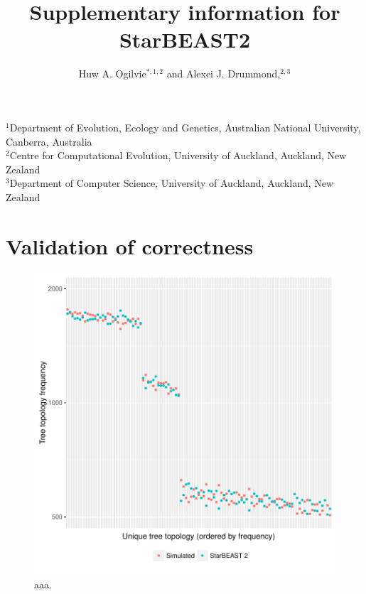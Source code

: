 \documentclass[12pt]{article}
\begin{document}
\begin{minipage}[h]{\textwidth}
	\title{Supplementary information for StarBEAST2}
	\author{Huw A. Ogilvie$^{\ast,1,2}$ and Alexei J. Drummond,$^{2,3}$}
    \maketitle
\end{minipage}

\raggedright
$^{1}$Department of Evolution, Ecology and Genetics, Australian National University, Canberra, Australia\\
$^{2}$Centre for Computational Evolution, University of Auckland, Auckland, New Zealand\\
$^{3}$Department of Computer Science, University of Auckland, Auckland, New Zealand

\clearpage

\section{Validation of correctness}

\begin{figure}[htb!]
\centering
\includegraphics[width=16cm]{species_topology_frequencies.pdf}
\caption
{aaa.}
\label{fig:speciesTopologyFrequencies}
\end{figure}
\end{document}
